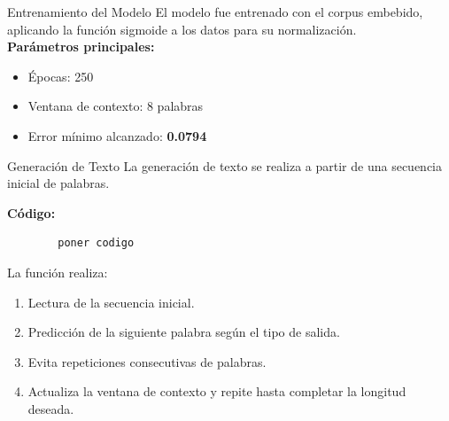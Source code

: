 \documentclass{beamer}
\begin{document}
\begin{frame}{Entrenamiento del Modelo}
	\small
	El modelo fue entrenado con el corpus embebido, aplicando la función sigmoide a los datos para su normalización.\\[0.5em]
	
	\textbf{Parámetros principales:}
	\begin{itemize}
		\item Épocas: 250
		\item Ventana de contexto: 8 palabras
		\item Error mínimo alcanzado: \textbf{0.0794}
	\end{itemize}
	
	
\end{frame}

\begin{frame}[fragile]{Generación de Texto}
	\small
	La generación de texto se realiza a partir de una secuencia inicial de palabras.
	
	\vspace{0.5em}
	\textbf{Código:}
	\begin{verbatim}
		poner codigo
	\end{verbatim}
	
	\vspace{0.5em}
	La función realiza:
	\begin{enumerate}
		\item Lectura de la secuencia inicial.
		\item Predicción de la siguiente palabra según el tipo de salida.
		\item Evita repeticiones consecutivas de palabras.
		\item Actualiza la ventana de contexto y repite hasta completar la longitud deseada.
	\end{enumerate}
\end{frame}
\end{document}
